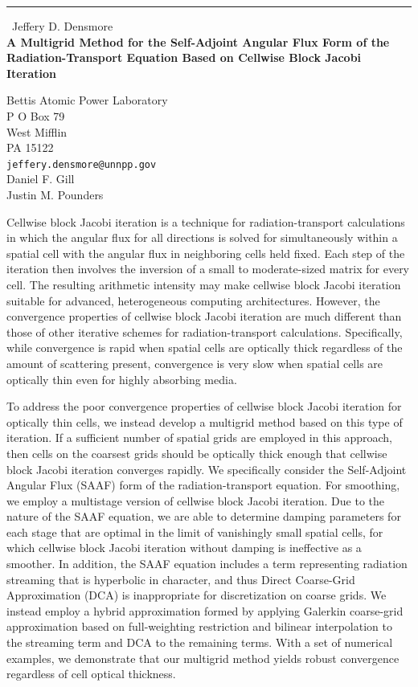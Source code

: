 \documentclass{report}
\begin{document}
\begin{center}
\rule{6in}{1pt} \
{\large Jeffery D. Densmore \\
{\bf A Multigrid Method for the Self-Adjoint Angular Flux Form of the Radiation-Transport Equation Based on Cellwise Block Jacobi Iteration}}

Bettis Atomic Power Laboratory \\ P O Box 79 \\ West Mifflin \\ PA 15122
\\
{\tt jeffery.densmore@unnpp.gov}\\
Daniel F. Gill\\
Justin M. Pounders\end{center}

Cellwise block Jacobi iteration is a technique for radiation-transport
calculations in which the angular flux for all directions is solved for
simultaneously within a spatial cell with the angular flux in neighboring
cells held fixed. Each step of the iteration then involves the inversion
of a small to moderate-sized matrix for every cell. The resulting
arithmetic intensity may make cellwise block Jacobi iteration suitable
for advanced, heterogeneous computing architectures. However, the
convergence properties of cellwise block Jacobi iteration are much
different than those of other iterative schemes for radiation-transport
calculations. Specifically, while convergence is rapid when spatial cells
are optically thick regardless of the amount of scattering present,
convergence is very slow when spatial cells are optically thin even for
highly absorbing media.

To address the poor convergence properties of cellwise block Jacobi
iteration for optically thin cells, we instead develop a multigrid method
based on this type of iteration. If a sufficient number of spatial grids
are employed in this approach, then cells on the coarsest grids should be
optically thick enough that cellwise block Jacobi iteration converges
rapidly. We specifically consider the Self-Adjoint Angular Flux (SAAF)
form of the radiation-transport equation. For smoothing, we employ a
multistage version of cellwise block Jacobi iteration. Due to the nature
of the SAAF equation, we are able to determine damping parameters for
each stage that are optimal in the limit of vanishingly small spatial
cells, for which cellwise block Jacobi iteration without damping is
ineffective as a smoother. In addition, the SAAF equation includes a term
representing radiation streaming that is hyperbolic in character, and
thus Direct Coarse-Grid Approximation (DCA) is inappropriate for
discretization on coarse grids. We instead employ a hybrid approximation
formed by applying Galerkin coarse-grid approximation based on
full-weighting restriction and bilinear interpolation to the streaming
term and DCA to the remaining terms. With a set of numerical examples, we
demonstrate that our multigrid method yields robust convergence
regardless of cell optical thickness.
\end{document}
